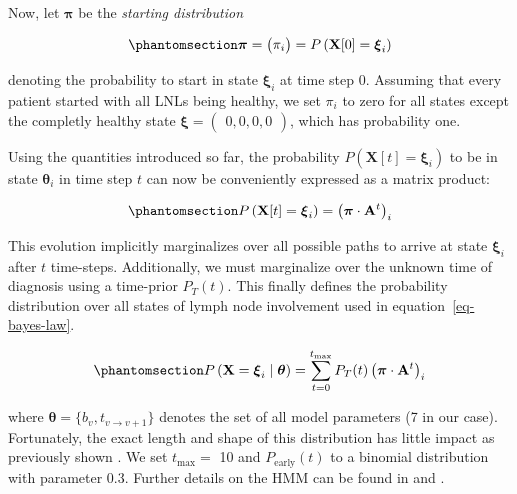 \documentclass[11pt,twocolumn,twoside]{article}
\begin{document}
Now, let \(\boldsymbol{\pi}\) be the \emph{starting distribution}

\begin{equation}\phantomsection\label{eq-starting-distribution}{
\boldsymbol{\pi} = \begin{pmatrix} \pi_i \end{pmatrix} = P \left( \mathbf{X}[0] = \boldsymbol{\xi}_i \right)
}\end{equation}

denoting the probability to start in state \(\boldsymbol{\xi}_i\) at
time step 0. Assuming that every patient started with all LNLs being
healthy, we set \(\pi_i\) to zero for all states except the completly
healthy state
\(\boldsymbol{\xi} = \begin{pmatrix} 0, 0, 0, 0 \end{pmatrix}\), which
has probability one.

Using the quantities introduced so far, the probability
\(P \left( \mathbf{X}[t]=\boldsymbol{\xi}_i \right)\) to be in state
\(\boldsymbol{\theta}_i\) in time step \(t\) can now be conveniently
expressed as a matrix product:

\begin{equation}\phantomsection\label{eq-evolution}{
P \left( \mathbf{X}[t]=\boldsymbol{\xi}_i \right) = \left( \boldsymbol{\pi} \cdot \mathbf{A}^t \right)_i
}\end{equation}

This evolution implicitly marginalizes over all possible paths to arrive
at state \(\boldsymbol{\xi}_i\) after \(t\) time-steps. Additionally, we
must marginalize over the unknown time of diagnosis using a time-prior
\(P_T(t)\). This finally defines the probability distribution over all
states of lymph node involvement used in equation~\ref{eq-bayes-law}.

\begin{equation}\phantomsection\label{eq-marginalized-evolution}{
P \left( \mathbf{X}=\boldsymbol{\xi}_i \mid \boldsymbol{\theta} \right) = \sum_{t=0}^{t_\text{max}} P_T(t) \left( \boldsymbol{\pi} \cdot \mathbf{A}^t \right)_i
}\end{equation}

where \(\boldsymbol{\theta}=\{ b_v, t_{v \rightarrow v+1} \}\) denotes
the set of all model parameters (7 in our case). Fortunately, the exact
length and shape of this distribution has little impact as previously
shown \autocite{ludwig_hidden_2021}. We set \(t_\text{max}=\) 10 and
\(P_\text{early}(t)\) to a binomial distribution with parameter 0.3.
Further details on the HMM can be found in \textcite{ludwig_hidden_2021}
and \textcite{zora231470}.
\end{document}
